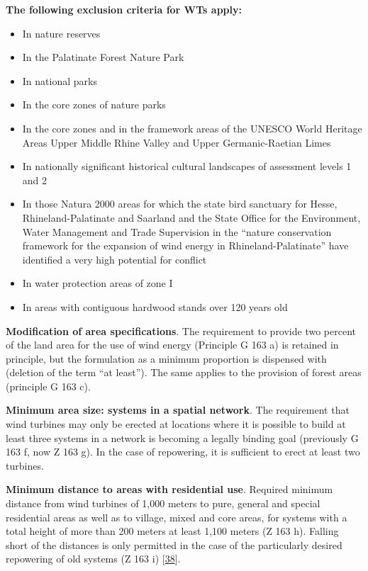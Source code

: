 \documentclass[a4paper,11pt]{article}
\providecommand{\tightlist}{%
  \setlength{\itemsep}{0pt}\setlength{\parskip}{0pt}}
\begin{document}
\textbf{The following exclusion criteria for WTs apply:}
\begin{itemize}
\tightlist
\item
  In nature reserves
\item
  In the Palatinate Forest Nature Park
\item
  In national parks
\item
  In the core zones of nature parks
\item
  In the core zones and in the framework areas of the UNESCO World Heritage Areas Upper Middle Rhine Valley and Upper Germanic-Raetian Limes
\item
  In nationally significant historical cultural landscapes of assessment levels 1 and 2
\item
  In those Natura 2000 areas for which the state bird sanctuary for Hesse, Rhineland-Palatinate and Saarland and the State Office for the Environment, Water Management and Trade Supervision in the ``nature conservation framework for the expansion of wind energy in Rhineland-Palatinate'' have identified a very high potential for conflict
\item
  In water protection areas of zone I
\item
  In areas with contiguous hardwood stands over 120 years old
\end{itemize}
\textbf{Modification of area specifications}. The requirement to provide two percent of the land area for the use of wind energy (Principle G 163 a) is retained in principle, but the formulation as a minimum proportion is dispensed with (deletion of the term ``at least''). The same applies to the provision of forest areas (principle G 163 c).

\textbf{Minimum area size: systems in a spatial network}. The requirement that wind turbines may only be erected at locations where it is possible to build at least three systems in a network is becoming a legally binding goal (previously G 163 f, now Z 163 g). In the case of repowering, it is sufficient to erect at least two turbines.

\textbf{Minimum distance to areas with residential use}. Required minimum distance from wind turbines of 1,000 meters to pure, general and special residential areas as well as to village, mixed and core areas, for systems with a total height of more than 200 meters at least 1,100 meters (Z 163 h). Falling short of the distances is only permitted in the case of the particularly desired repowering of old systems (Z 163 i) {[}\protect\hyperlink{ref-MinisteriumdesInnernundfurSport.2017}{38}{]}.
\end{document}
